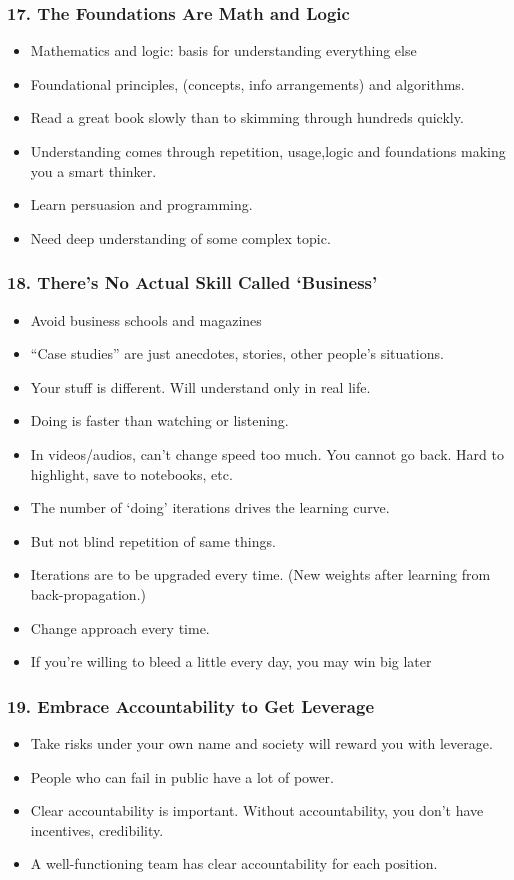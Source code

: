 \begin{frame}[fragile]
\frametitle{17. The Foundations Are Math and Logic}
\begin{itemize}
\item Mathematics and logic:  basis for understanding everything else
\item Foundational principles, (concepts, info arrangements) and algorithms.
\item Read a great book slowly than to skimming through hundreds quickly.
\item Understanding comes through repetition, usage,logic and foundations making you a smart thinker.
\item Learn persuasion and programming.
\item Need deep understanding of some complex topic.
\end{itemize}
\end{frame}

\begin{frame}[fragile]
\frametitle{18. There's No Actual Skill Called `Business'}
\begin{itemize}
\item Avoid business schools and magazines
\item ``Case studies'' are just anecdotes, stories, other people's situations. 
\item Your stuff is different. Will understand only in real life.
\item Doing is faster than watching or listening. 
\item In videos/audios, can't change speed too much. You cannot go back. Hard to highlight, save to notebooks, etc.
\item The number of `doing' iterations drives the learning curve.
\item But not blind repetition of same things. 
\item Iterations are to be upgraded every time. (New weights after learning from back-propagation.)
\item Change approach every time.
\item If you're willing to bleed a little every day, you may win big later
\end{itemize}
\end{frame}


\begin{frame}[fragile]
\frametitle{19. Embrace Accountability to Get Leverage}
\begin{itemize}
\item Take risks under your own name and society will reward you with leverage.
\item People who can fail in public have a lot of power.
\item Clear accountability is important. Without accountability, you don't have incentives, credibility.
\item A well-functioning team has clear accountability for each position.
\end{itemize}
\end{frame}


